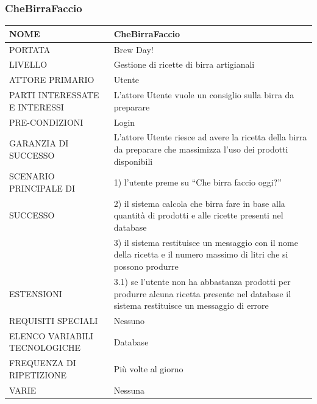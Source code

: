 \documentclass[a4paper, titlepage]{article}
\begin{document}
\subsubsection{CheBirraFaccio}
\begin{longtable}{p{6cm}p{7cm}}\toprule
    NOME & CheBirraFaccio\\\midrule
    PORTATA & Brew Day!\\\midrule
    LIVELLO & Gestione di ricette di birra artigianali\\\midrule
    ATTORE PRIMARIO & Utente\\\midrule
    PARTI INTERESSATE E INTERESSI &
    L’attore Utente vuole un consiglio sulla birra da preparare\\\midrule
    PRE-CONDIZIONI & Login\\\midrule
    GARANZIA DI SUCCESSO &L’attore Utente riesce ad avere la ricetta della birra da preparare che massimizza l’uso dei prodotti disponibili\\\midrule
    SCENARIO PRINCIPALE DI
    & 1) l’utente preme su “Che birra faccio oggi?”\\
    SUCCESSO & 2) il sistema calcola che birra fare in base alla quantità di prodotti e alle ricette presenti nel database\\
    & 3) il sistema restituisce un messaggio con il nome della ricetta e il numero massimo di litri che si possono produrre\\
    ESTENSIONI
    & 3.1) se l'utente non ha abbastanza prodotti per produrre alcuna ricetta presente nel database il sistema restituisce un messaggio di errore\\\midrule
    REQUISITI SPECIALI & Nessuno\\\midrule
    ELENCO VARIABILI TECNOLOGICHE & Database\\\midrule
    FREQUENZA DI RIPETIZIONE & Più volte al giorno\\\midrule
    VARIE & Nessuna \\\bottomrule
\end{longtable}

\newpage
\end{document}
